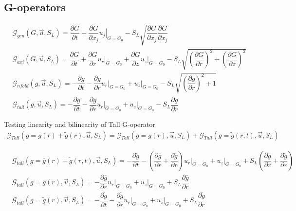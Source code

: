 \clearpage
\subsection{G-operators}
\begin{align}
&\mathcal{G}_{gen}(G,\vec{u},S_L)=\dfrac{\partial G}{\partial t} + \dfrac{\partial G}{\partial x_j} \left.u_j\right|_{G=G_0} - S_L \sqrt{\dfrac{\partial G}{\partial x_j}\dfrac{\partial G}{\partial x_j}}\\
&\mathcal{G}_{axi}(G,\vec{u},S_L)=\dfrac{\partial G}{\partial t} + \dfrac{\partial G}{\partial r} \left.u_r\right|_{G=G_0}+\dfrac{\partial G}{\partial z} \left.u_z\right|_{G=G_0} - S_L \sqrt{\left(\dfrac{\partial G}{\partial r}\right)^2+ \left(\dfrac{\partial G}{\partial z}\right)^2}\\
&\mathcal{G}_{nfold}(g,\vec{u},S_L)=-\dfrac{\partial g}{\partial t} -\dfrac{\partial g}{\partial r} \left.u_r\right|_{G=G_0}+\left.u_z\right|_{G=G_0} - S_L \sqrt{\left(\dfrac{\partial g}{\partial r}\right)^2+ 1}\\
&\mathcal{G}_{tall}(g,\vec{u},S_L)=-\dfrac{\partial g}{\partial t} -\dfrac{\partial g}{\partial r} \left.u_r\right|_{G=G_0}+\left.u_z\right|_{G=G_0} - S_L \dfrac{\partial g}{\partial r}
\end{align}

Testing linearity and bilinearity of Tall G-operator 
\begin{align*}
	\mathcal{G}_{Tall}(g=\bar{g}(r)+\tilde{g}(r),\vec{u},S_L)=\mathcal{G}_{Tall}(g=\bar{g}(r),\vec{u},S_L)+ 	\mathcal{G}_{Tall}(g=\tilde{g}(r,t),\vec{u},S_L)
\end{align*}

\begin{align*}
&\mathcal{G}_{tall}(g=\bar{g}(r)+\tilde{g}(r,t),\vec{u},S_L)=-\dfrac{\partial \tilde{g}}{\partial t} - \left(\dfrac{\partial \bar{g}}{\partial r}+ \dfrac{\partial \tilde{g}}{\partial r} \right)\left.u_r\right|_{G=G_0}+\left.u_z\right|_{G=G_0} + S_L \left(\dfrac{\partial \bar{g}}{\partial r}+ \dfrac{\partial \tilde{g}}{\partial r} \right)\\
&\mathcal{G}_{tall}(g=\bar{g}(r),\vec{u},S_L)=- \dfrac{\partial \bar{g}}{\partial r} \left.u_r\right|_{G=G_0}+\left.u_z\right|_{G=G_0} + S_L \dfrac{\partial \bar{g}}{\partial r}\\
&\mathcal{G}_{tall}(g=\tilde{g}(r),\vec{u},S_L)=- \dfrac{\partial \tilde{g}}{\partial t}-\dfrac{\partial \tilde{g}}{\partial r} \left.u_r\right|_{G=G_0}+\left.u_z\right|_{G=G_0} + S_L \dfrac{\partial \tilde{g}}{\partial r}
\end{align*}








